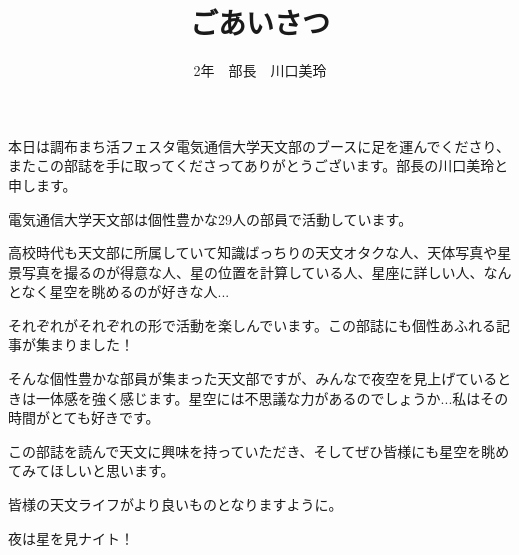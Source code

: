 \documentclass[a4paper,10pt]{jarticle}
\begin{document}
 
\title{ごあいさつ}
\author{2年　部長　川口美玲}
\date{}
\maketitle

\begin{center}


\phantom{a}\par
本日は調布まち活フェスタ電気通信大学天文部のブースに足を運んでくださり、またこの部誌を手に取ってくださってありがとうございます。部長の川口美玲と申します。


\phantom{a}\par
電気通信大学天文部は個性豊かな29人の部員で活動しています。


\phantom{a}\par
高校時代も天文部に所属していて知識ばっちりの天文オタクな人、天体写真や星景写真を撮るのが得意な人、星の位置を計算している人、星座に詳しい人、なんとなく星空を眺めるのが好きな人...


\phantom{a}\par
それぞれがそれぞれの形で活動を楽しんでいます。この部誌にも個性あふれる記事が集まりました！


\phantom{a}\par
そんな個性豊かな部員が集まった天文部ですが、みんなで夜空を見上げているときは一体感を強く感じます。星空には不思議な力があるのでしょうか...私はその時間がとても好きです。


\phantom{a}\par
この部誌を読んで天文に興味を持っていただき、そしてぜひ皆様にも星空を眺めてみてほしいと思います。


\phantom{a}\par
皆様の天文ライフがより良いものとなりますように。


\phantom{a}\par
夜は星を見ナイト！


\end{center}
\end{document}
